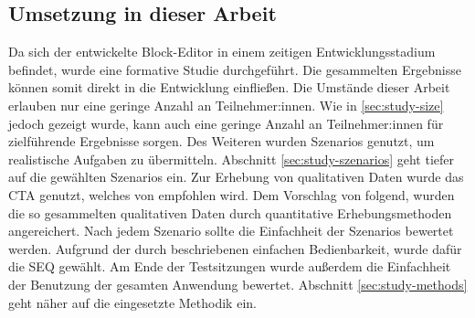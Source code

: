 \subsection{Umsetzung in dieser Arbeit}

Da sich der entwickelte Block-Editor in einem zeitigen Entwicklungsstadium befindet, wurde eine formative Studie durchgeführt. Die gesammelten Ergebnisse können somit direkt in die Entwicklung einfließen. Die Umstände dieser Arbeit erlauben nur eine geringe Anzahl an Teilnehmer:innen. Wie in \ref{sec:study-size} jedoch gezeigt wurde, kann auch eine geringe Anzahl an Teilnehmer:innen für zielführende Ergebnisse sorgen. Des Weiteren wurden Szenarios genutzt, um realistische Aufgaben zu übermitteln. Abschnitt \ref{sec:study-szenarios} geht tiefer auf die gewählten Szenarios ein. Zur Erhebung von qualitativen Daten wurde das \ac{CTA} genutzt, welches von \textcite{alhadretiRethinkingThinking2018} empfohlen wird. Dem Vorschlag von \textcite{barnumUsabilityTesting2021} folgend, wurden die so gesammelten qualitativen Daten durch quantitative Erhebungsmethoden angereichert. Nach jedem Szenario sollte die Einfachheit der Szenarios bewertet werden. Aufgrund der durch \textcite{sauroComparisonThree2009} beschriebenen einfachen Bedienbarkeit, wurde dafür die \ac{SEQ} gewählt. Am Ende der Testsitzungen wurde außerdem die Einfachheit der Benutzung der gesamten Anwendung bewertet. Abschnitt \ref{sec:study-methods} geht näher auf die eingesetzte Methodik ein.
